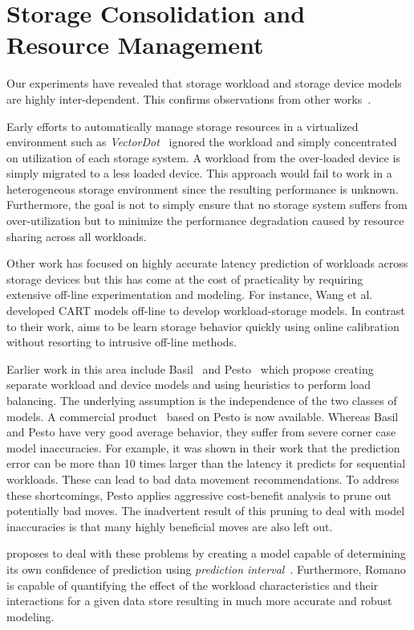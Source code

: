 \section{Storage Consolidation and Resource Management}
\label{bg_srm}
Our experiments have revealed that storage workload and storage device
models are highly inter-dependent.
This confirms observations from other works~\cite{wang:2004, park:2011}.

Early efforts to automatically manage storage resources in a
virtualized environment such as \emph{VectorDot}~\cite{singh:2008}
ignored the workload and simply concentrated on utilization of each
storage system. A workload from the over-loaded device is simply
migrated to a less loaded device. This approach would fail to
work in a heterogeneous storage environment since the resulting
performance is unknown. Furthermore, the goal is not to simply ensure
that no storage system suffers from over-utilization but to minimize the performance degradation caused by resource sharing across all workloads.

Other work has focused on highly accurate latency prediction of
workloads across storage devices but this has come at the cost of
practicality by requiring extensive off-line experimentation and
modeling. For instance, Wang et al.~\cite{wang:2004} developed
CART models off-line to develop workload-storage models. In contrast
to their work, \romano aims to be learn storage behavior quickly using
online calibration without resorting to intrusive off-line methods.

Earlier work in this area include Basil~\cite{gulati:2010} and
Pesto~\cite{gulati:2011} which propose creating separate workload and device
models and using heuristics to perform load balancing. The underlying
assumption is the independence of the two classes of models. A
commercial product~\cite{vmware:2006} based on Pesto is now
available. Whereas Basil and Pesto have very good average behavior,
they suffer from severe corner case model inaccuracies. For example,
it was shown in their work that the prediction error can be more than
10 times larger than the latency it predicts for sequential workloads.
These can lead to bad data movement recommendations. To address these
shortcomings, Pesto applies aggressive cost-benefit analysis to prune
out potentially bad moves. The inadvertent result of this pruning to
deal with model inaccuracies is that many highly beneficial moves are
also left out.

\romano proposes to deal with these problems by creating a model
capable of determining its own confidence of prediction using
\emph{prediction interval}~\cite{chatfield:1993}.
Furthermore, Romano is capable of quantifying the effect of the
workload characteristics and their interactions for a given data store
resulting in much more accurate and robust modeling.
